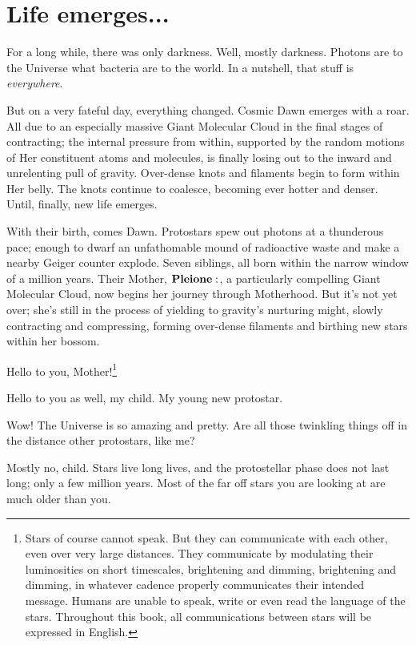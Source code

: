 \section{Life emerges...}

For a long while, there was only darkness.  Well, mostly darkness.  Photons are to the Universe what bacteria are to the world.  In a nutshell, that stuff is \textit{everywhere}.  

But on a very fateful day, everything changed.  Cosmic Dawn emerges with a roar.  All due to an especially massive Giant Molecular Cloud in the final stages of contracting; the internal pressure from within, supported by the random motions of Her constituent atoms and molecules, is finally losing out to the inward and unrelenting pull of gravity.  Over-dense knots and filaments begin to form within Her belly.  The knots continue to coalesce, becoming ever hotter and denser. Until, finally, new life emerges.  

With their birth, comes Dawn.  Protostars spew out photons at a thunderous pace; enough to dwarf an unfathomable mound of radioactive waste and make a nearby Geiger counter explode.  Seven siblings, all born within the narrow window of a million years. Their Mother, $\Pleione$, a particularly compelling Giant Molecular Cloud, now begins her journey through Motherhood.  But it's not yet over; she's still in the process of yielding to gravity's nurturing might, slowly contracting and compressing, forming over-dense filaments and birthing new stars within her bossom.  

\Maia Hello to you, Mother!\footnote{Stars of course cannot speak.  But they can communicate with each other, even over very large distances.  They communicate by modulating their luminosities on short timescales, brightening and dimming, brightening and dimming, in whatever cadence properly communicates their intended message.  Humans are unable to speak, write or even read the language of the stars.  Throughout this book, all communications between stars will be expressed in English.} 

\Pleione Hello to you as well, my child.  My young new protostar.

\Maia Wow!  The Universe is so amazing and pretty.  Are all those twinkling things off in the distance other protostars, like me?

\Pleione Mostly no, child.  Stars live long lives, and the protostellar phase does not last long; only a few million years.  Most of the far off stars you are looking at are much older than you.

